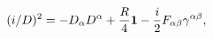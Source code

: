 \begin{equation}
(i\slash D )^2=-D_\alpha D^\alpha +{R\over 4}{\bf 1} 
-{i\over 2} F_{\alpha\beta}\gamma^{\alpha\beta},
\label{NRH}
\end{equation}

